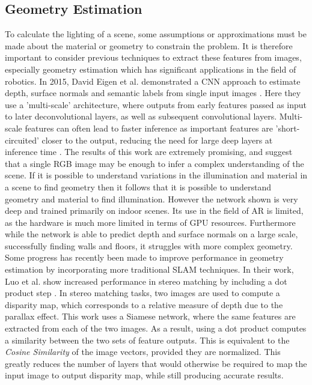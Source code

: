 \documentclass[ %
                    author={Gavin Parker},
                supervisor={Dr. Neill Campbell},
                    degree={MEng},
                     title={Deep Siamese Networks for Illumination Estimation from Stereo Images},
                  subtitle={},
                      type={Research},
                      year={2018} ]{dissertation}
\begin{document}
\subsection{Geometry Estimation}
To calculate the lighting of a scene, some assumptions or approximations must be made about the material or geometry to constrain the problem. It is therefore important to consider previous techniques to extract these features from images, especially geometry estimation which has significant applications in the field of robotics. In 2015, David Eigen et al. demonstrated a CNN approach to estimate depth, surface normals and semantic labels from single input images \cite{7410661}. Here they use a 'multi-scale' architecture, where outputs from early features passed as input to later deconvolutional layers, as well as subsequent convolutional layers. Multi-scale features can often lead to faster inference as important features are 'short-circuited' closer to the output, reducing the need for large deep layers at inference time . The results of this work are extremely promising, and suggest that a single RGB image may be enough to infer a complex understanding of the scene. If it is possible to understand variations in the illumination and material in a scene to find geometry then it follows that it is possible to understand geometry and material to find illumination.  However the network shown is very deep and trained primarily on indoor scenes. Its use in the field of AR is limited, as the hardware is much more limited in terms of GPU resources. Furthermore while the network is able to predict depth and surface normals on a large scale, successfully finding walls and floors, it struggles with more complex geometry. Some progress has recently been made to improve performance in geometry estimation by incorporating more traditional SLAM techniques. In their work, Luo et al. show increased performance in stereo matching by including a dot product step \cite{7780983}. In stereo matching tasks, two images are used to compute a disparity map, which corresponds to a relative measure of depth due to the parallax effect. This work uses a Siamese network, where the same features are extracted from each of the two images. As a result, using a dot product computes a similarity between the two sets of feature outputs. This is equivalent to the \textit{Cosine Similarity} of the image vectors, provided they are normalized. This greatly reduces the number of layers that would otherwise be required to map the input image to output disparity map, while still producing accurate results.
\end{document}
